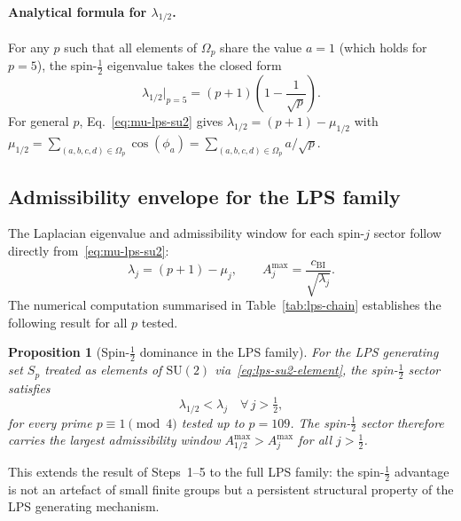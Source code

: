 \documentclass[11pt,a4paper]{article}
\newtheorem{proposition}{Proposition}
\begin{document}
    \paragraph{Analytical formula for $\lambda_{1/2}$.}
      For any $p$ such that all elements of $\Omega_p$ share the value $a = 1$
      (which holds for $p = 5$), the spin-$\tfrac{1}{2}$ eigenvalue takes the
      closed form
    \begin{equation}
      \lambda_{1/2}\big|_{p=5}
      = (p+1)\!\left(1 - \frac{1}{\sqrt{p}}\right).
      \label{eq:lambda-half-p5}
      \end{equation}
      For general $p$, Eq.~\eqref{eq:mu-lps-su2} gives
      $\lambda_{1/2} = (p+1) - \mu_{1/2}$ with
      $\mu_{1/2} = \sum_{(a,b,c,d)\in\Omega_p} \cos(\phi_a)
      = \sum_{(a,b,c,d)\in\Omega_p} a/\sqrt{p}$.

\subsection{Admissibility envelope for the LPS family}
  \label{sec:step6c}

  The Laplacian eigenvalue and admissibility window for each spin-$j$ sector
  follow directly from~\eqref{eq:mu-lps-su2}:
  \begin{equation}
    \lambda_j = (p+1) - \mu_j,
    \qquad
    A^{\max}_j = \frac{c_{\mathrm{BI}}}{\sqrt{\lambda_j}}.
    \label{eq:Amax-lps}
  \end{equation}
  The numerical computation summarised in Table~\ref{tab:lps-chain} establishes
  the following result for all $p$ tested.

  \begin{proposition}[Spin-$\tfrac{1}{2}$ dominance in the LPS family]
    \label{prop:lps-hierarchy}
    For the LPS generating set $S_p$ treated as elements of $\mathrm{SU}(2)$
    via~\eqref{eq:lps-su2-element}, the spin-$\tfrac{1}{2}$ sector satisfies
    \begin{equation}
      \lambda_{1/2} < \lambda_j \quad \forall\, j > \tfrac{1}{2},
      \label{eq:lps-ordering}
    \end{equation}
    for every prime $p \equiv 1 \pmod{4}$ tested up to $p = 109$.
    The spin-$\tfrac{1}{2}$ sector therefore carries the largest admissibility
    window $A^{\max}_{1/2} > A^{\max}_j$ for all $j > \tfrac{1}{2}$.
  \end{proposition}

  \noindent
  This extends the result of Steps~1--5 to the full LPS family:
  the spin-$\tfrac{1}{2}$ advantage is not an artefact of small finite groups
  but a persistent structural property of the LPS generating mechanism.
\end{document}
